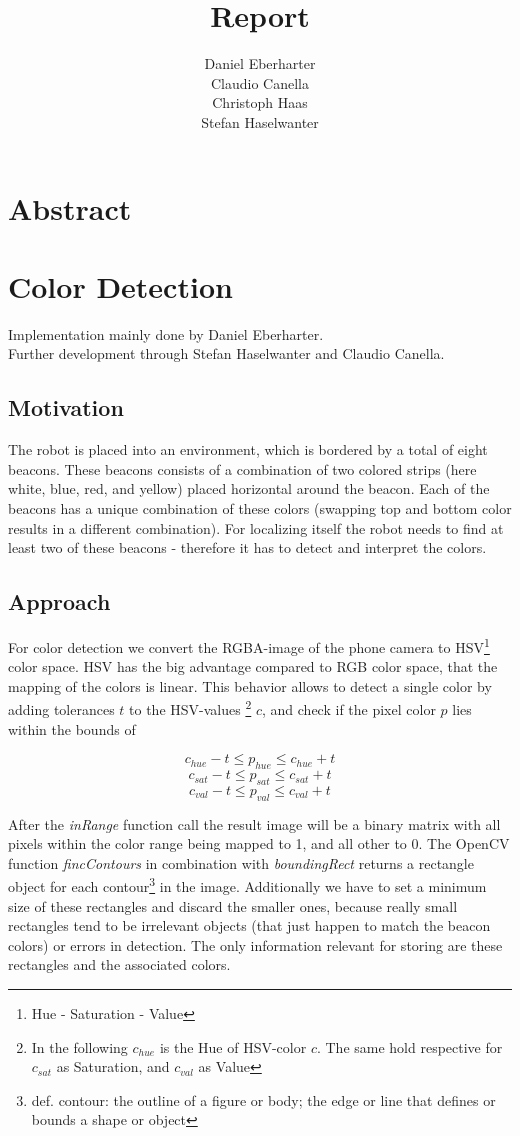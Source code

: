 \documentclass[703031]{iisreport}
\title{Report}
\author{Daniel Eberharter\\ Claudio Canella\\ Christoph Haas\\ Stefan Haselwanter}
\begin{document}
\maketitle

\section{Abstract}


\section{Color Detection}
Implementation mainly done by Daniel Eberharter.\\
Further development through Stefan Haselwanter and Claudio Canella.
\subsection{Motivation}
The robot is placed into an environment, which is bordered by a total of eight beacons. These beacons consists of a combination of two colored strips (here white, blue, red, and yellow) placed horizontal around the beacon. Each of the beacons has a unique combination of these colors (swapping top and bottom color results in a different combination).
For localizing itself the robot needs to find at least two of these beacons - therefore it has to detect and interpret the colors.
\subsection{Approach}
For color detection we convert the RGBA-image of the phone camera to HSV\footnote{Hue - Saturation - Value} color space. HSV has the big advantage compared to RGB color space, that the mapping of the colors is linear. This behavior allows to detect a single color by adding tolerances $t$ to the HSV-values \footnote{In the following $c_{hue}$ is the Hue of HSV-color $c$. The same hold respective for $c_{sat}$ as Saturation, and $c_{val}$ as Value} $c$, and check if the pixel color $p$ lies within the bounds of 

\[c_{hue} - t \le p_{hue} \le c_{hue} + t\]
\[c_{sat} - t \le p_{sat} \le c_{sat} + t\]
\[c_{val} - t \le p_{val} \le c_{val} + t\]

After the \emph{inRange} function call\cite{opencv_man_arrays} the result image will be a binary matrix with all pixels within the color range being mapped to 1, and all other to 0. The OpenCV function \emph{fincContours}\cite{opencv_man_struct_analysis} in combination with \emph{boundingRect}\cite{opencv_man_struct_analysis} returns a rectangle object for each contour\footnote{def. contour: the outline of a figure or body; the edge or line that defines or bounds a shape or object\cite{dict_contour}} in the image. Additionally we have to set a minimum size of these rectangles and discard the smaller ones, because really small rectangles tend to be irrelevant objects (that just happen to match the beacon colors) or errors in detection.
The only information relevant for storing are these rectangles and the associated colors. 
\end{document}
